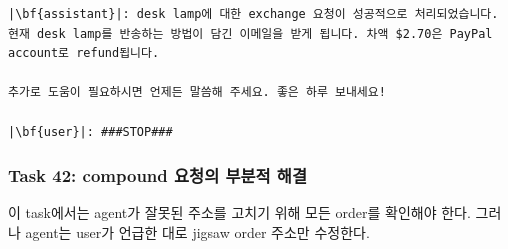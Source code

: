\begin{longlisting}
\begin{verbatim}
|\bf{assistant}|: desk lamp에 대한 exchange 요청이 성공적으로 처리되었습니다. 현재 desk lamp를 반송하는 방법이 담긴 이메일을 받게 됩니다. 차액 $2.70은 PayPal account로 refund됩니다.

추가로 도움이 필요하시면 언제든 말씀해 주세요. 좋은 하루 보내세요!

|\bf{user}|: ###STOP###
\end{verbatim}
\end{longlisting}


















\newpage

\subsubsection{Task 42: compound 요청의 부분적 해결} \label{sec:partially_solve}

이 task에서는 agent가 잘못된 주소를 고치기 위해 모든 order를 확인해야 한다. 그러나 agent는 user가 언급한 대로 jigsaw order 주소만 수정한다.

